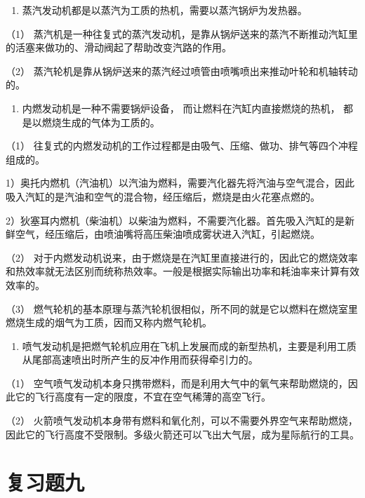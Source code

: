 \begin{enumerate}
\def\labelenumi{\arabic{enumi}.}
\setcounter{enumi}{6}
\tightlist
\item
  蒸汽发动机都是以蒸汽为工质的热机，需要以蒸汽锅炉为发热器。
\end{enumerate}

（1）
蒸汽机是一种往复式的蒸汽发动机，是靠从锅炉送来的蒸汽不断推动汽缸里的活塞来做功的、滑动阀起了帮助改变汽路的作用。

（2）
蒸汽轮机是靠从锅炉送来的蒸汽经过喷管由喷嘴喷出来推动叶轮和机轴转动的。

\begin{enumerate}
\def\labelenumi{\arabic{enumi}.}
\setcounter{enumi}{7}
\tightlist
\item
  内燃发动机是一种不需要锅炉设备， 而让燃料在汽缸内直接燃烧的热机，
  都是以燃烧生成的气体为工质的。
\end{enumerate}

（1）
往复式的内燃发动机的工作过程都是由吸气、压缩、做功、排气等四个冲程组成的。

1）奥托内燃机（汽油机）以汽油为燃料，需要汽化器先将汽油与空气混合，因此吸入汽缸的是汽油和空气的混合物，经压缩后，燃烧是由火花塞点燃的。

2）狄塞耳内燃机（柴油机）以柴油为燃料，不需要汽化器。首先吸入汽缸的是新鲜空气，经压缩后，由喷油嘴将高压柴油喷成雾状进入汽缸，引起燃烧。

（2）
对于内燃发动机说来，由于燃烧是在汽缸里直接进行的，因此它的燃烧效率和热效率就无法区别而统称热效率。一般是根据实际输出功率和耗油率来计算有效效率的。

（3）
燃气轮机的基本原理与蒸汽轮机很相似，所不同的就是它以燃料在燃烧室里燃烧生成的烟气为工质，因而又称内燃气轮机。

\begin{enumerate}
\def\labelenumi{\arabic{enumi}.}
\setcounter{enumi}{8}
\tightlist
\item
  喷气发动机是把燃气轮机应用在飞机上发展而成的新型热机，主要是利用工质从尾部高速喷出时所产生的反冲作用而获得牵引力的。
\end{enumerate}

（1）
空气喷气发动机本身只携带燃料，而是利用大气中的氧气来帮助燃烧的，因此它的飞行高度有一定的限度，不宜在空气稀薄的高空飞行。

（2）
火箭喷气发动机本身带有燃料和氧化剂，可以不需要外界空气来帮助燃烧，因此它的飞行高度不受限制。多级火箭还可以飞出大气层，成为星际航行的工具。

\section{复习题九}\label{ux590dux4e60ux9898ux4e5d}

